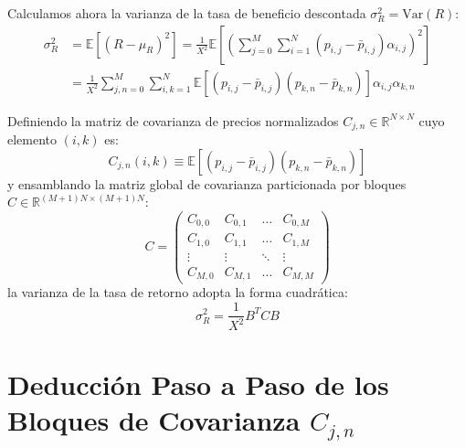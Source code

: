 \documentclass[11pt,a4paper]{report}
\numberwithin{equation}{chapter}
\begin{document}
Calculamos ahora la varianza de la tasa de beneficio descontada $\sigma_R^2 = \mathrm{Var}(R)$:
\begin{align}
    \sigma_R^2 &= \mathbb{E}\left[ (R - \mu_R)^2 \right] = \frac{1}{X^2} \mathbb{E}\left[ \left( \sum_{j=0}^M \sum_{i=1}^N (p_{i,j} - \bar{p}_{i,j}) \alpha_{i,j} \right)^2 \right] \nonumber \\
    &= \frac{1}{X^2} \sum_{j,n=0}^M \sum_{i,k=1}^N \mathbb{E}\left[ (p_{i,j} - \bar{p}_{i,j}) (p_{k,n} - \bar{p}_{k,n}) \right] \alpha_{i,j} \alpha_{k,n} \label{eq:sigma_R_escalar}
\end{align}

Definiendo la matriz de covarianza de precios normalizados $C_{j,n} \in \mathbb{R}^{N \times N}$ cuyo elemento $(i,k)$ es:
\begin{equation}
    C_{j,n}(i,k) \equiv \mathbb{E}\left[ (p_{i,j} - \bar{p}_{i,j}) (p_{k,n} - \bar{p}_{k,n}) \right]
\end{equation}
y ensamblando la matriz global de covarianza particionada por bloques $C \in \mathbb{R}^{(M+1)N \times (M+1)N}$:
\begin{equation}
    C = \begin{pmatrix}
        C_{0,0} & C_{0,1} & \dots & C_{0,M} \\
        C_{1,0} & C_{1,1} & \dots & C_{1,M} \\
        \vdots  & \vdots  & \ddots & \vdots  \\
        C_{M,0} & C_{M,1} & \dots & C_{M,M}
    \end{pmatrix}
\end{equation}
la varianza de la tasa de retorno adopta la forma cuadrática:
\begin{equation}
    \boxed{\sigma_R^2 = \frac{1}{X^2} B^T C B} \label{eq:sigma_R_matricial}
\end{equation}

\section{Deducción Paso a Paso de los Bloques de Covarianza $C_{j,n}$}
\end{document}
